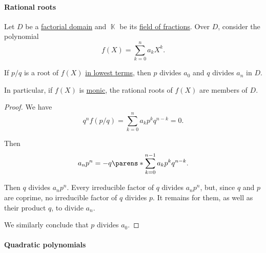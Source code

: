 \paragraph{Rational roots}

\begin{theorem}\label{thm:rational_root_test}
  Let \( D \) be a \hyperref[def:factorial_domain]{factorial domain} and \( \BbbK \) be its \hyperref[def:field_of_fractions]{field of fractions}. Over \( D \), consider the polynomial
  \begin{equation*}
    f(X) = \sum_{k=0}^n a_k X^k.
  \end{equation*}

  If \( p / q \) is a root of \( f(X) \) \hyperref[def:lowest_terms]{in lowest terms}, then \( p \) divides \( a_0 \) and \( q \) divides \( a_n \) in \( D \).
\end{theorem}
\begin{comments}
  \item In particular, if \( f(X) \) is \hyperref[def:monic_polynomial]{monic}, the rational roots of \( f(X) \) are members of \( D \).
\end{comments}
\begin{proof}
  We have
  \begin{equation*}
    q^n f(p / q)
    =
    \sum_{k=0}^n a_k p^k q^{n-k}
    =
    0.
  \end{equation*}

  Then
  \begin{equation*}
    a_n p^n = -q \parens*{ \sum_{k=0}^{n-1} a_k p^k q^{n-k} }.
  \end{equation*}

  Then \( q \) divides \( a_n p^n \). Every irreducible factor of \( q \) divides \( a_n p^n \), but, since \( q \) and \( p \) are coprime, no irreducible factor of \( q \) divides \( p \). It remains for them, as well as their product \( q \), to divide \( a_n \).

  We similarly conclude that \( p \) divides \( a_0 \).
\end{proof}

\paragraph{Quadratic polynomials}

